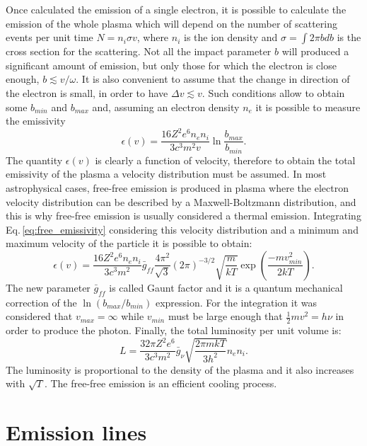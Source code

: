 \documentclass[../main.tex]{subfiles}
\begin{document}
Once calculated the emission of a single electron, it is possible to calculate the emission of the whole plasma which will depend on the number of scattering events per unit time $N = n_i \sigma v$, where $n_i$ is the ion density and $\sigma = \int 2\pi b db$ is the cross section for the scattering.
Not all the impact parameter $b$ will produced a significant amount of emission, but only those for which the electron is close enough, $b\lesssim v/\omega$. 
It is also convenient to assume that the change in direction of the electron is small, in order to have $\Delta v \lesssim v$.
Such conditions allow to obtain some $b_{min}$ and $b_{max}$ and, assuming an electron density $n_e$ it is possible to measure the emissivity
\begin{equation}
    \label{eq:free_emissivity} 
    \epsilon(v) = \frac{16 Z^2 e^6 n_e n_i}{3c^3m^2v}\ln\frac{b_{max}}{b_{min}}.
\end{equation}
The quantity $\epsilon(v)$ is clearly a function of velocity, therefore to obtain the total emissivity of the plasma a velocity distribution must be assumed.
In most astrophysical cases, free-free emission is produced in plasma where the electron velocity distribution can be described by a Maxwell-Boltzmann distribution, and this is why free-free emission is usually considered a thermal emission.
Integrating Eq.\,\ref{eq:free_emissivity} considering this velocity distribution and a minimum and maximum velocity of the particle it is possible to obtain:
\begin{equation}
    \label{eq:free_emissivity_total}
    \epsilon(v) = \frac{16 Z^2 e^6 n_e n_i}{3c^3m^2}\bar{g}_{ff}\frac{4\pi^2}{\sqrt 3}(2\pi)^{-3/2}\sqrt{\frac{m}{kT}} \exp\left(\frac{-mv^2_{min}}{2kT}\right).
\end{equation}
The new parameter $\bar{g}_{ff}$ is called Gaunt factor and it is a quantum mechanical correction of the $\ln(b_{max}/b_{min})$ expression.
For the integration it was considered that $v_{max} = \infty$ while $v_{min}$ must be large enough that $\frac{1}{2}mv^2 = h\nu$ in order to produce the photon.
Finally, the total luminosity per unit volume is:
\begin{equation}
    \label{eq:free_lum_tot}
    L=\frac{32 \pi Z^2 e^6}{3c^3m^2}\bar{g}_{\nu}\sqrt{\frac{2 \pi m k T}{3h^2}}n_e n_i.
\end{equation}
The luminosity is proportional to the density of the plasma and it also increases with $\sqrt T$.
The free-free emission is an efficient cooling process.


\section{Emission lines}
\label{sec:emission_line}
\end{document}
